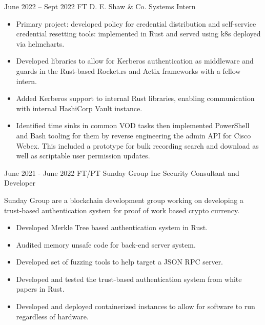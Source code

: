 \documentclass[
	9pt, %
]{FreemanCV}
\begin{document}
\begin{paracol}{2}
\jobentry
	{June 2022 -- Sept 2022} %
	{FT} %
	{D. E. Shaw \& Co.} %
	{Systems Intern} %
	{\begin{itemize}[noitemsep, topsep=0pt, partopsep=0pt, leftmargin=8pt, before =\leavevmode\vspace*{-\baselineskip}]
			\item Primary project: developed policy for credential distribution and self-service credential resetting tools: implemented in Rust and served using k8s deployed via helmcharts.
			\item Developed libraries to allow for Kerberos authentication as middleware and guards in the Rust-based Rocket.rs and Actix frameworks with a fellow intern.
			\item  Added Kerberos support to internal Rust libraries, enabling communication with internal HashiCorp Vault instance. 
			\item Identified time sinks in common VOD tasks then implemented 
			PowerShell and Bash tooling for them by reverse engineering the admin API for Cisco Webex. 
			This included a prototype for bulk recording search and download as well as scriptable user permission updates. 
	\end{itemize}} %

\jobentry
	{June 2021 - June 2022} %
	{FT/PT} %
	{Sunday Group Inc} %
	{Security Consultant and Developer} %
	{Sunday Group are a blockchain development group working on developing a trust-based authentication 
	system for proof of work based crypto currency. 
	\medspace

	\begin{itemize}[noitemsep, topsep=0pt, partopsep=0pt, leftmargin=8pt]
		\item	Developed Merkle Tree based authentication system in Rust.
		\item	Audited memory unsafe code for back-end server system.
		\item	Developed set of fuzzing tools to help target a JSON RPC server.
		\item	Developed and tested the trust-based authentication system from white papers in Rust.
		\item	Developed and deployed containerized instances to allow for software to run regardless of hardware. 
	\end{itemize}
	} %


\end{paracol}
\end{document}
